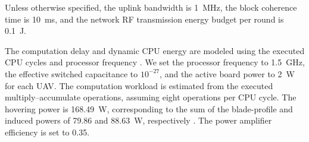 Unless otherwise specified, the uplink bandwidth is 1~MHz,
the block coherence time is 10~ms, and the network RF
transmission energy budget per round is 0.1~J.

The computation delay and dynamic CPU energy are modeled
using the executed CPU cycles and processor frequency
\cite{Tang_TWC_2025,Liang_TWC_2025_Energy}.
We set the processor frequency to 1.5~GHz, the effective
switched capacitance to $10^{-27}$, and the active board
power to 2~W for each UAV.
The computation workload is estimated from the executed
multiply--accumulate operations, assuming eight operations
per CPU cycle.
The hovering power is 168.49~W, corresponding to the sum
of the blade-profile and induced powers of 79.86 and
88.63~W, respectively \cite{Wang_TCOMM_2025_Rechargeable}.
The power amplifier efficiency is set to 0.35.
